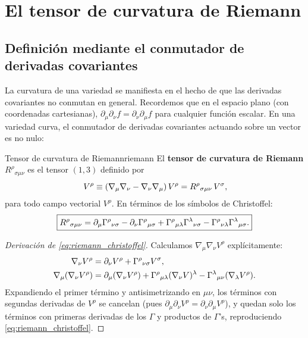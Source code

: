 \section{El tensor de curvatura de Riemann}
\label{sec:riemann}

\subsection{Definición mediante el conmutador de derivadas covariantes}

La curvatura de una variedad se manifiesta en el hecho de que las derivadas covariantes no conmutan en general. Recordemos que en el espacio plano (con coordenadas cartesianas), $\partial_\mu \partial_\nu f = \partial_\nu \partial_\mu f$ para cualquier función escalar. En una variedad curva, el conmutador de derivadas covariantes actuando sobre un vector es no nulo:

\begin{definicion}{Tensor de curvatura de Riemann}{riemann}
El \textbf{tensor de curvatura de Riemann} $R^\rho{}_{\sigma\mu\nu}$ es el tensor $(1,3)$ definido por
\begin{equation}
  [\nabla_\mu, \nabla_\nu]\, V^\rho \equiv (\nabla_\mu\nabla_\nu - \nabla_\nu\nabla_\mu)\, V^\rho
  = \Riemann\, V^\sigma,
  \label{eq:def_riemann}
\end{equation}
para todo campo vectorial $V^\rho$. En términos de los símbolos de Christoffel:
\begin{equation}
  \boxed{R^\rho{}_{\sigma\mu\nu}
  = \partial_\mu \Gamma^{\rho}{}_{\nu \sigma}
  - \partial_\nu \Gamma^{\rho}{}_{\mu \sigma}
  + \Gamma^{\rho}{}_{\mu \lambda}\Gamma^{\lambda}{}_{\nu \sigma}
  - \Gamma^{\rho}{}_{\nu \lambda}\Gamma^{\lambda}{}_{\mu \sigma}.}
  \label{eq:riemann_christoffel}
\end{equation}
\end{definicion}

\begin{proof}[Derivación de \eqref{eq:riemann_christoffel}]
Calculamos $\nabla_\mu\nabla_\nu V^\rho$ explícitamente:
\begin{align*}
  \nabla_\nu V^\rho &= \partial_\nu V^\rho + \Gamma^{\rho}{}_{\nu \sigma}V^\sigma,\\
  \nabla_\mu(\nabla_\nu V^\rho) &= \partial_\mu(\nabla_\nu V^\rho) + \Gamma^{\rho}{}_{\mu \lambda}(\nabla_\nu V)^\lambda - \Gamma^{\lambda}{}_{\mu \nu}(\nabla_\lambda V^\rho).
\end{align*}
Expandiendo el primer término y antisimetrizando en $\mu\nu$, los términos con segundas derivadas de $V^\rho$ se cancelan (pues $\partial_\mu\partial_\nu V^\rho = \partial_\nu\partial_\mu V^\rho$), y quedan solo los términos con primeras derivadas de los $\Gamma$ y productos de $\Gamma$'s, reproduciendo \eqref{eq:riemann_christoffel}.
\end{proof}

